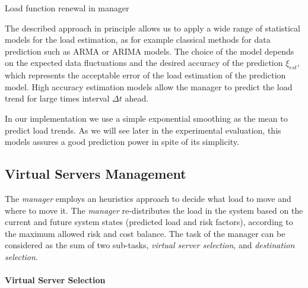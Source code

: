 \documentclass[final,10pt,a5paper]{phdimt}
\newcommand{\timeWait}{\Delta t}
\theoremstyle{definition}
\begin{document}
\begin{algorithm}[tbh]



{

{
	\;
}
}
\caption{Load function renewal in manager} 
\label{alg:passive}
\end{algorithm}




The described approach in principle allows us to apply a wide range of statistical models for the load estimation, as for example classical methods for data prediction such as ARMA or ARIMA \cite{montgomery2011introduction} models. The choice of the model depends on the expected data fluctuations and the desired accuracy of the prediction $\xi_{est}$, which 
represents the acceptable error of the load estimation of the prediction model. 
High accuracy estimation models allow the manager to predict the load trend for large times interval $\timeWait$ ahead. 






In our implementation we use a simple exponential smoothing \cite{gardner2006exponential} as the mean to predict load trends.
As we will see later in the experimental evaluation, this models assures a good prediction power in spite of its simplicity. 



\subsection{Virtual Servers Management}

The \emph{manager} employs an heuristics approach to decide what load to move and where to move it.
The \emph{manager} re-distributes the load in the system based on the current and future system states (predicted load and risk factors),  according to the maximum allowed risk and cost balance.
The task of the manager can be considered as the sum of two sub-tasks, \textit{virtual server selection}, and \textit{destination selection}.



\paragraph{Virtual Server Selection}
\end{document}
